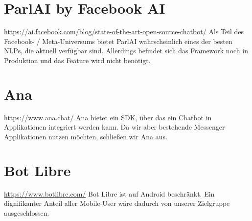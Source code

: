 \section{ParlAI by Facebook AI} \url{https://ai.facebook.com/blog/state-of-the-art-open-source-chatbot/}
Als Teil des Facebook- / Meta-Universums bietet ParlAI wahrscheinlich eines der besten NLPs, die aktuell verfügbar sind. Allerdings befindet sich das Framework noch in Produktion und das Feature wird nicht benötigt.

\section{Ana} \url{https://www.ana.chat/}
Ana bietet ein SDK, über das ein Chatbot in Applikationen integriert werden kann. Da wir aber bestehende Messenger Applikationen nutzen möchten, schließen wir Ana aus.

\section{Bot Libre} \url{https://www.botlibre.com/}
Bot Libre ist auf Android beschränkt. Ein dignifikanter Anteil aller Mobile-User wäre dadurch von unserer Zielgruppe ausgeschlossen.

